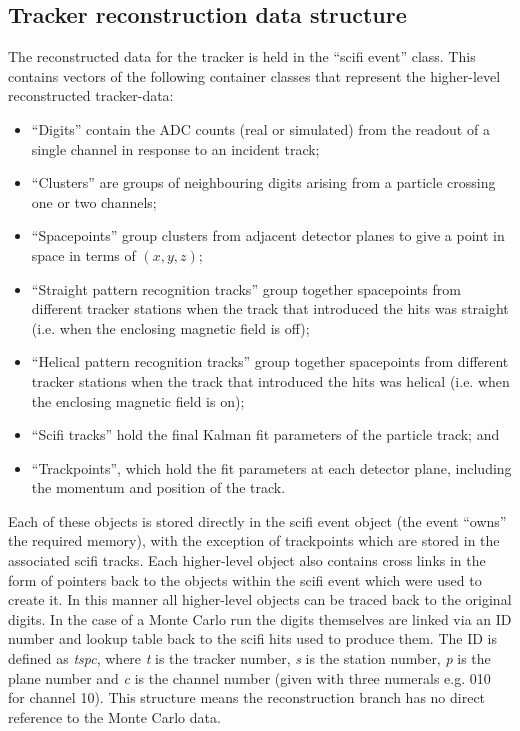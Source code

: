\subsection{Tracker reconstruction data structure}
\label{subsec:TrackerReconDataStructure}
The reconstructed data for the tracker is held in the ``scifi event'' class.  This contains vectors of the following container classes that represent the higher-level reconstructed tracker-data:

\begin{itemize}
  \item ``Digits'' contain the ADC counts (real or simulated) from the readout of a single channel in response to an incident track;
  \item ``Clusters'' are groups of neighbouring digits arising from a particle crossing one or two channels;
  \item ``Spacepoints'' group clusters from adjacent detector planes to give a point in space in terms of $(x, y, z)$;
  \item ``Straight pattern recognition tracks'' group together spacepoints from different tracker stations when the track that introduced the hits was straight (i.e. when the enclosing  magnetic field is off); %
  \item ``Helical pattern recognition tracks'' group together spacepoints from different tracker stations when the track that introduced the hits was helical (i.e. when the enclosing magnetic field is on); %
  \item ``Scifi tracks'' hold the final Kalman fit parameters of the particle track; and
  \item ``Trackpoints'', which hold the fit parameters at each detector plane, including the momentum and position of the track.
\end{itemize}

Each of these objects is stored directly in the scifi event object (the event ``owns'' the required memory), with the exception of trackpoints which are stored in the associated scifi tracks.  Each higher-level object also contains cross links in the form of pointers back to the objects within the scifi event which were used to create it. In this manner all higher-level objects can be traced back to the original digits.  In the case of a Monte Carlo run the digits themselves are linked via an ID number and lookup table back to the scifi hits used to produce them. The ID is defined as \textit{tspc}, where \textit{t} is the tracker number, \textit{s} is the station number, \textit{p} is the plane number and \textit{c} is the channel number (given with three numerals e.g. 010 for channel 10).  This structure means the reconstruction branch has no direct reference to the Monte Carlo data.